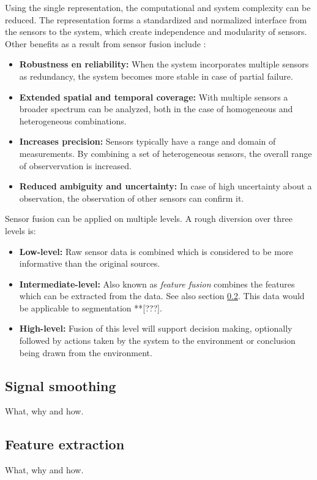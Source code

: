    Using the single representation, the computational and system complexity can be reduced.
    The representation forms a standardized and normalized interface from the sensors to the system, which create independence and modularity of sensors.
    Other benefits as a result from sensor fusion include \cite{elmenreich2001introduction}:
    \begin{itemize}
      \item \textbf{Robustness en reliability:} When the system incorporates multiple sensors as redundancy, the system becomes more stable in case of partial failure.
      \item \textbf{Extended spatial and temporal coverage:} With multiple sensors a broader spectrum can be analyzed, both in the case of homogeneous and heterogeneous combinations.
      \item \textbf{Increases precision:} Sensors typically have a range and domain of measurements.
      By combining a set of heterogeneous sensors, the overall range of observervation is increased.
      \item \textbf{Reduced ambiguity and uncertainty:} In case of high uncertainty about a observation, the observation of other sensors can confirm it.
    \end{itemize}

    Sensor fusion can be applied on multiple levels. A rough diversion over three levels is:
    \begin{itemize}
      \item \textbf{Low-level:} Raw sensor data is combined which is considered to be more informative than the original sources.
      \item \textbf{Intermediate-level:} Also known as \emph{feature fusion} combines the features which can be extracted from the data.
      See also section \ref{sec:feature_extraction}.
      This data would be applicable to segmentation **[???].
      \item \textbf{High-level:} Fusion of this level will support decision making, optionally followed by actions taken by the system to the environment or conclusion being drawn from the environment.
    \end{itemize}


    \subsection{Signal smoothing}
    What, why and how.

    \subsection{Feature extraction}
    \label{sec:feature_extraction}
    What, why and how.